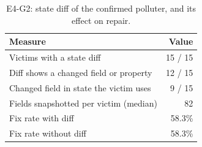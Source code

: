 \begin{table}[t]
\centering
\footnotesize
\caption{E4-G2: state diff of the confirmed polluter, and its effect on repair.}
\label{tab:g2}
\begin{tabular}{lr}
\toprule
\textbf{Measure} & \textbf{Value} \\
\midrule
Victims with a state diff & 15 / 15 \\
Diff shows a changed field or property & 12 / 15 \\
Changed field in state the victim uses & 9 / 15 \\
Fields snapshotted per victim (median) & 82 \\
Fix rate with diff & 58.3\% \\
Fix rate without diff & 58.3\% \\
\bottomrule
\end{tabular}
\end{table}
